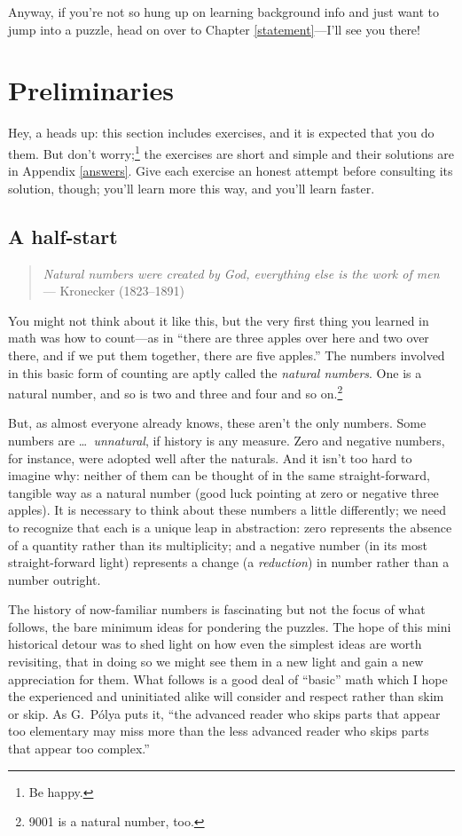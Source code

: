 \documentclass{book}
\begin{document}
Anyway, if you're not so hung up on learning background info and just want to jump into a puzzle, head on over to Chapter \ref{statement}---I'll see you there!
\chapter{Preliminaries}\label{prelim}
Hey, a heads up: this section includes exercises, and it is expected that you do them. But don't worry;\footnote{Be happy.} the exercises are short and simple and their solutions are in Appendix \ref{answers}. Give each exercise an honest attempt before consulting its solution, though; you'll learn more this way, and you'll learn faster.

\section{A half-start}
\begin{quote}
\emph{Natural numbers were created by God, everything else is the work of men} — Kronecker (1823–1891)
\end{quote}
You might not think about it like this, but the very first thing you learned in math was how to count---as in ``there are three
apples over here and two over there, and if we put them together, there are five apples.'' The numbers involved in this basic form of counting are aptly called the \emph{natural numbers}. One is a natural number, and so is two and three and four and so on.\footnote{9001 is a natural number, too.}

But, as almost everyone already knows, these aren't the only numbers. Some numbers are \dots \emph{\ \!unnatural}, if history is any measure. Zero and negative numbers, for instance, were adopted well after the naturals. And it isn't too hard to imagine why: neither of them can be thought of in the same straight-forward, tangible way as a natural number (good luck pointing at zero or negative three apples). It is necessary to think about these numbers a little differently; we need to recognize that each is a unique leap in abstraction: zero represents the absence of a quantity rather than its multiplicity; and a negative number (in its most straight-forward light) represents a change (a \emph{reduction}) in number rather than a number outright.

The history of now-familiar numbers is fascinating but not the focus of what follows, the bare minimum ideas for pondering the puzzles. The hope of this mini historical detour was to shed light on how even the simplest ideas are worth revisiting, that in doing so we might see them in a new light and gain a new appreciation for them. What follows is a good deal of ``basic'' math which I hope the experienced and uninitiated alike will consider and respect rather than skim or skip. As G.\ P\'olya puts it, ``the advanced reader who skips parts that appear too elementary may miss more than the less advanced reader who skips parts that appear too complex.''
\end{document}
